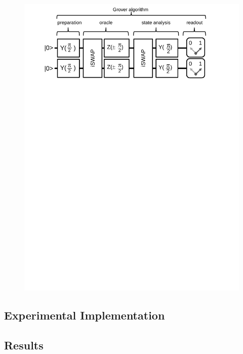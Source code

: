 \begin{figure}
	\centering
		\includegraphics[width=1.\textwidth]{./material/papers/grover/figures/grover_algorithm_schematic}
	\label{fig:GroverAlgorithmSchematic}
	\caption{}
\end{figure}

\subsection{Experimental Implementation}


\subsection{Results}


